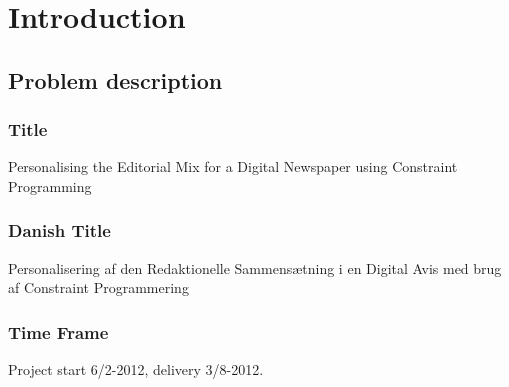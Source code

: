 \chapter{Introduction} %
\label{ch:introduction}

\section{Problem description}
%
%
\subsection{Title}
Personalising the Editorial Mix for a Digital Newspaper using Constraint Programming

\subsection{Danish Title}
Personalisering af den Redaktionelle Sammensætning i en Digital Avis med brug af Constraint Programmering

\subsection{Time Frame}
Project start 6/2-2012, delivery 3/8-2012.

